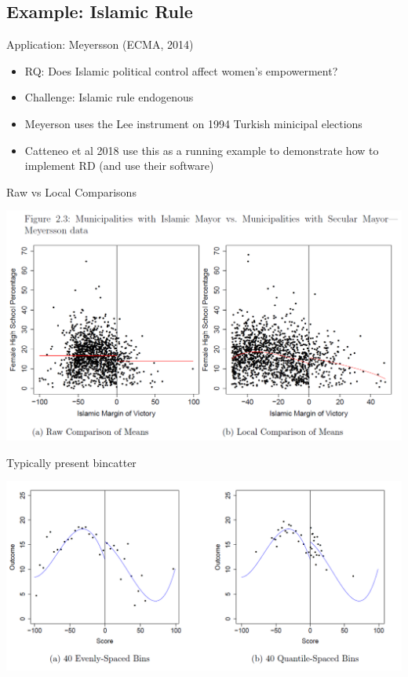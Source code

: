 \subsection{Example: Islamic Rule}

\begin{frame}{Application: Meyersson (ECMA, 2014) }
  \begin{itemize}
  \item RQ: Does Islamic political control affect women's empowerment? 
  \item Challenge: Islamic rule endogenous 
  \item Meyerson uses the Lee instrument on 1994 Turkish minicipal elections 
  \item Catteneo et al 2018 use this as a running example to demonstrate how to implement RD (and use their software)
  \end{itemize}
\end{frame}
  
\begin{frame}{Raw vs Local Comparisons}
  \begin{center}
  \includegraphics[width=\textwidth]{./resources/CatteneoRawScatter}
  \end{center}
\end{frame}

\begin{frame}{Typically present bincatter}
  \begin{center}
  \includegraphics[width=\textwidth]{./resources/CatteneoBinscatter}
  \end{center}
\end{frame}


